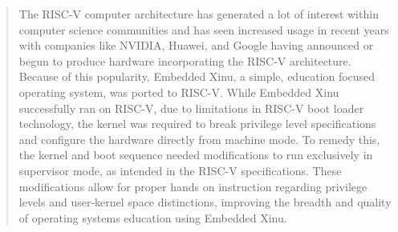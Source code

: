 \begin{abstract}

The RISC-V computer architecture has generated a lot of interest within computer science communities and has seen increased usage in recent years with companies like NVIDIA, Huawei, and Google having announced or begun to produce hardware incorporating the RISC-V architecture. Because of this popularity, Embedded Xinu, a simple, education focused operating system, was ported to RISC-V. While Embedded Xinu successfully ran on RISC-V, due to limitations in RISC-V boot loader technology, the kernel was required to break privilege level specifications and configure the hardware directly from machine mode. To remedy this, the kernel and boot sequence needed modifications to run exclusively in supervisor mode, as intended in the RISC-V specifications. These modifications allow for proper hands on instruction regarding privilege levels and user-kernel space distinctions, improving the breadth and quality of operating systems education using Embedded Xinu.

\end{abstract}
